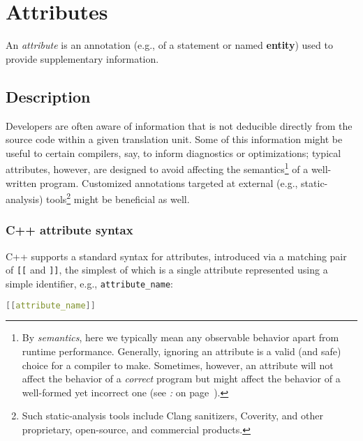 \newpage
\section[Attributes]{Attributes}\label{attributes}



An \emph{attribute} is an annotation (e.g., of a statement or named
\textbf{entity}) used to provide supplementary information.

\subsection[Description]{Description}\label{description}

Developers are often aware of information that is not deducible directly
from the source code within a given translation unit. Some of this
information might be useful to certain compilers, say, to inform
diagnostics or optimizations; typical attributes, however, are designed
to avoid affecting the semantics{\cprotect\footnote{By \emph{semantics}, here
we typically mean any observable behavior apart from runtime
performance. Generally, ignoring an attribute is a valid (and safe)
choice for a compiler to make. Sometimes, however, an
attribute will not affect the behavior of a \emph{correct} program but might affect the behavior of a well-formed yet incorrect one (see
{\it{}:} {\it{}} on page~\pageref{delineating-explicit-assumptions-in-code-to-achieve-better-optimizations}).}} of a
well-written program. Customized annotations targeted at external (e.g.,
static-analysis) tools{\cprotect\footnote{Such static-analysis tools include Clang sanitizers, Coverity, and other
proprietary, open-source, and commercial products.}} might be
beneficial as well.

\subsubsection[C++ attribute syntax]{C++ attribute syntax}\label{c++-attribute-syntax}

C++ supports a standard syntax for attributes, introduced via a matching
pair of \texttt{[[} and \texttt{]]}, the simplest of which is a single
attribute represented using a simple identifier, e.g.,
\texttt{attribute\_name}:

\begin{lstlisting}[language=C++]
[[attribute_name]]
\end{lstlisting}

